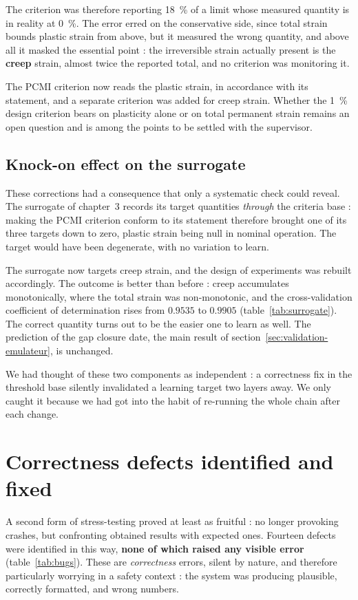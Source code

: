 The criterion was therefore reporting \SI{18}{\percent} of a limit whose measured
quantity is in reality at \SI{0}{\percent}. The error erred on the conservative
side, since total strain bounds plastic strain from above, but it measured the wrong
quantity, and above all it masked the essential point : the irreversible strain
actually present is the \textbf{creep} strain, almost twice the reported total,
and no criterion was monitoring it.

The PCMI criterion now reads the plastic strain, in accordance with its
statement, and a separate criterion was added for creep strain. Whether the
\SI{1}{\percent} design criterion bears on plasticity alone or on total
permanent strain remains an open question and is among the points to be settled
with the supervisor.

\subsection{Knock-on effect on the surrogate}

These corrections had a consequence that only a systematic check could reveal.
The surrogate of chapter~3 records its target quantities \emph{through} the
criteria base : making the PCMI criterion conform to its statement therefore
brought one of its three targets down to zero, plastic strain being null in
nominal operation. The target would have been degenerate, with no variation to
learn.

The surrogate now targets creep strain, and the design of experiments was
rebuilt accordingly. The outcome is better than before : creep accumulates
monotonically, where the total strain was non-monotonic, and the
cross-validation coefficient of determination rises from $0.9535$ to
$\mathbf{0.9905}$ (table~\ref{tab:surrogate}). The correct quantity turns out to
be the easier one to learn as well. The prediction of the gap closure date, the
main result of section~\ref{sec:validation-emulateur}, is unchanged.

We had thought of these two components as independent : a correctness fix in the
threshold base silently invalidated a learning target two layers away. We only
caught it because we had got into the habit of re-running the whole chain after
each change.

\section{Correctness defects identified and fixed}
\label{sec:bugs}

A second form of stress-testing proved at least as fruitful : no longer
provoking crashes, but confronting obtained results with expected ones. Fourteen
defects were identified in this way, \textbf{none of which raised any visible
error} (table~\ref{tab:bugs}). These are \textit{correctness} errors, silent by
nature, and therefore particularly worrying in a safety context : the system was
producing plausible, correctly formatted, and wrong numbers.

